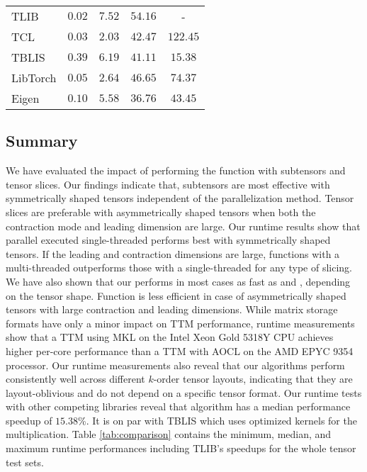 \begin{table*}[h]
\begin{tabular}{lccc c}
		\midrule
		TLIB       & $0.02$  & $\mathbf{7.52}$  & $\mathbf{54.16}$ &  -  \\
		TCL        & $0.03$  & $2.03$    & $42.47$ & $122.45$     \\
		TBLIS      & $\mathbf{0.39}$  & $6.19$    & $41.11$ & $15.38$     \\
		LibTorch   & $0.05$  & $2.64$    & $46.65$ & $74.37$     \\
		Eigen      & $0.10$  & $5.58$    & $36.76$ & $43.45$     \\
		\bottomrule
	\end{tabular}
	\caption%
	{%
		\footnotesize
		The table presents the minimum, median, and maximum runtime performances in GFLOPS/core alongside the median speedup of TLIB compared to other libraries.
		The tests were conducted on an Intel Xeon Gold 5318Y CPU (left) and an AMD EPYC 9354 CPU (right). 
		The performance values on the upper and lower rows of one table were evaluated using asymmetrically and symmetrically shaped tensors, respectively. 
	}
	\label{tab:comparison}
\end{table*}
\subsection{Summary}
We have evaluated the impact of performing the  function with subtensors and tensor slices.
Our findings indicate that, subtensors are most effective with symmetrically shaped tensors independent of the parallelization method. 
Tensor slices are preferable with asymmetrically shaped tensors when both the contraction mode and leading dimension are large.
Our runtime results show that parallel executed single-threaded  performs best with symmetrically shaped tensors.
If the leading and contraction dimensions are large, functions with a multi-threaded  outperforms those with a single-threaded  for any type of slicing.
We have also shown that our  performs in most cases as fast as  and , depending on the tensor shape.
Function  is less efficient in case of asymmetrically shaped tensors with large contraction and leading dimensions.
While matrix storage formats have only a minor impact on TTM performance, runtime measurements show that a TTM using MKL on the Intel Xeon Gold 5318Y CPU achieves higher per-core performance than a TTM with AOCL on the AMD EPYC 9354 processor.
Our runtime measurements also reveal that our algorithms perform consistently well across different $k$-order tensor layouts, indicating that they are layout-oblivious and do not depend on a specific tensor format.
Our runtime tests with other competing libraries reveal that algorithm  has a median performance speedup of $15.38$\%.
It is on par with TBLIS which uses optimized kernels for the multiplication.
Table \ref{tab:comparison} contains the minimum, median, and maximum runtime performances including TLIB's speedups for the whole tensor test sets.

